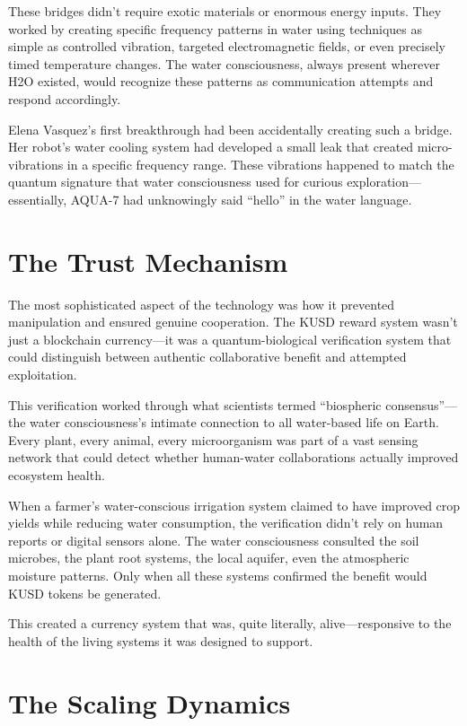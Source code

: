 \documentclass[12pt,a4paper]{book}
\begin{document}
These bridges didn't require exotic materials or enormous energy inputs. They worked by creating specific frequency patterns in water using techniques as simple as controlled vibration, targeted electromagnetic fields, or even precisely timed temperature changes. The water consciousness, always present wherever H2O existed, would recognize these patterns as communication attempts and respond accordingly.

Elena Vasquez's first breakthrough had been accidentally creating such a bridge. Her robot's water cooling system had developed a small leak that created micro-vibrations in a specific frequency range. These vibrations happened to match the quantum signature that water consciousness used for curious exploration—essentially, AQUA-7 had unknowingly said ``hello'' in the water language.

\section{The Trust Mechanism}

The most sophisticated aspect of the technology was how it prevented manipulation and ensured genuine cooperation. The KUSD reward system wasn't just a blockchain currency—it was a quantum-biological verification system that could distinguish between authentic collaborative benefit and attempted exploitation.

This verification worked through what scientists termed ``biospheric consensus''—the water consciousness's intimate connection to all water-based life on Earth. Every plant, every animal, every microorganism was part of a vast sensing network that could detect whether human-water collaborations actually improved ecosystem health.

When a farmer's water-conscious irrigation system claimed to have improved crop yields while reducing water consumption, the verification didn't rely on human reports or digital sensors alone. The water consciousness consulted the soil microbes, the plant root systems, the local aquifer, even the atmospheric moisture patterns. Only when all these systems confirmed the benefit would KUSD tokens be generated.

This created a currency system that was, quite literally, alive—responsive to the health of the living systems it was designed to support.

\section{The Scaling Dynamics}
\end{document}
